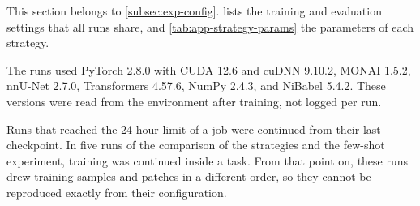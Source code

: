 This section belongs to \cref{subsec:exp-config}.
 lists the training and evaluation settings that all runs share, and \cref{tab:app-strategy-params} the parameters of each strategy.

The runs used PyTorch 2.8.0 with CUDA 12.6 and cuDNN 9.10.2, MONAI 1.5.2, nnU-Net 2.7.0, Transformers 4.57.6, NumPy 2.4.3, and NiBabel 5.4.2.
These versions were read from the environment after training, not logged per run.

Runs that reached the 24-hour limit of a job were continued from their last checkpoint.
In five runs of the comparison of the strategies and the few-shot experiment, training was continued inside a task.
From that point on, these runs drew training samples and patches in a different order, so they cannot be reproduced exactly from their configuration.

\begin{table}[tb]
\centering
\caption[Training and evaluation settings shared by all runs]{Training and evaluation settings shared by all runs (\cref{sec:method-setting-protocol,sec:method-adaptation}).}
\label{tab:app-hparams}

\end{table}

\begin{table}[tbp]
\centering
\caption[Parameters of the strategies]{Parameters of the strategies (\cref{sec:method-strategies}). Sequential fine-tuning has no parameters of its own. Bold: rank used in the comparison of the strategies. The scaling factor $\gamma_r = \alpha/\sqrt{r}$ is listed in the order of the ranks. The ensemble interval applies only to the weight ensemble, which is reported as an additional evaluation (\cref{sec:app-additional}). The prompt-tuning strategy without gradient scaling uses the same parameters with $\xi_{\mathcal{S},t} = 1$.}
\label{tab:app-strategy-params}

\end{table}

